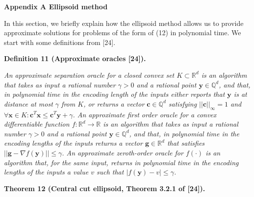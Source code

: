 \par\medskip\noindent\textbf{
Appendix A Ellipsoid method}\par




In this section, we briefly explain how the ellipsoid method allows us to provide approximate solutions for problems of the form of (12) in polynomial time. We start with some definitions from [24].\par





\par\medskip\noindent\textbf{
\textbf{Definition 11}\textbf{ }(Approximate oracles [24])\textbf{.}
}\par



\emph{An approximate separation oracle for a closed convex set $K\subset\mathbb{R}^{d}$ is an algorithm that takes as input a rational number $\gamma>0$ and a rational point ${\boldsymbol{y}}\in\mathbb{Q}^{d}$, and that, in polynomial time in the encoding length of the inputs either reports that ${\boldsymbol{y}}$ is at distance at most $\gamma$ from $K$, or returns a vector $\boldsymbol{c}\in\mathbb{Q}^{d}$ satisfying $||\boldsymbol{c}||_{\infty}=1$ and $\forall{\boldsymbol{x}}\in K\colon\boldsymbol{c}^{T}{\boldsymbol{x}}\leq\boldsymbol{c}^{T}{\boldsymbol{y}}+\gamma$. An approximate first order oracle for a convex differentiable function $f:\mathbb{R}^{d}\rightarrow\mathbb{R}$ is an algorithm that takes as input a rational number $\gamma>0$ and a rational point ${\boldsymbol{y}}\in\mathbb{Q}^{d}$, and that, in polynomial time in the encoding lengths of the inputs returns a vector $\boldsymbol{g}\in\mathbb{R}^{d}$ that satisfies $||\boldsymbol{g}-\nabla f({\boldsymbol{y}})||\leq\gamma$. An approximate zeroth-order oracle for $f(\cdot)$ is an algorithm that, for the same input, returns in polynomial time in the encoding lengths of the inputs a value $v$ such that $|f({\boldsymbol{y}})-v|\leq\gamma$.}\par







\par\medskip\noindent\textbf{
\textbf{Theorem 12}\textbf{ }(Central cut ellipsoid, Theorem 3.2.1 of [24])\textbf{.}
}\par



